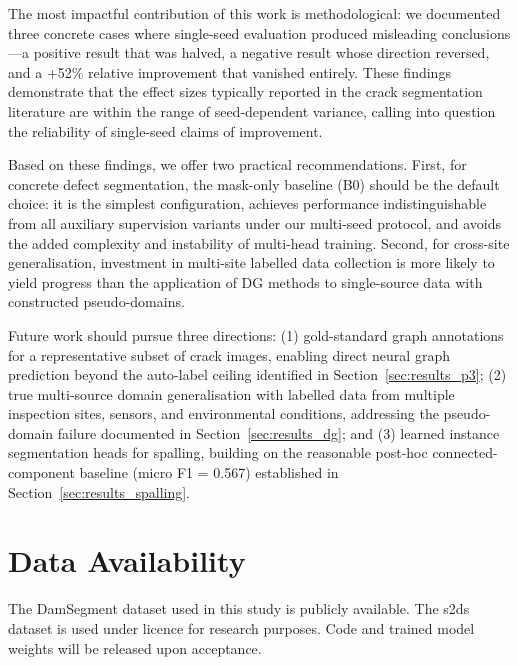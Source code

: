 \documentclass[preprint,12pt]{elsarticle}
\begin{document}
The most impactful contribution of this work is methodological: we documented three concrete cases where single-seed evaluation produced misleading conclusions---a positive result that was halved, a negative result whose direction reversed, and a +52\% relative improvement that vanished entirely. These findings demonstrate that the effect sizes typically reported in the crack segmentation literature are within the range of seed-dependent variance, calling into question the reliability of single-seed claims of improvement.

Based on these findings, we offer two practical recommendations. First, for concrete defect segmentation, the mask-only baseline (B0) should be the default choice: it is the simplest configuration, achieves performance indistinguishable from all auxiliary supervision variants under our multi-seed protocol, and avoids the added complexity and instability of multi-head training. Second, for cross-site generalisation, investment in multi-site labelled data collection is more likely to yield progress than the application of DG methods to single-source data with constructed pseudo-domains.

Future work should pursue three directions: (1) gold-standard graph annotations for a representative subset of crack images, enabling direct neural graph prediction beyond the auto-label ceiling identified in Section~\ref{sec:results_p3}; (2) true multi-source domain generalisation with labelled data from multiple inspection sites, sensors, and environmental conditions, addressing the pseudo-domain failure documented in Section~\ref{sec:results_dg}; and (3) learned instance segmentation heads for spalling, building on the reasonable post-hoc connected-component baseline (micro F1 = 0.567) established in Section~\ref{sec:results_spalling}.



\section*{Data Availability}

The DamSegment dataset used in this study is publicly available. The s2ds dataset is used under licence for research purposes. Code and trained model weights will be released upon acceptance.





\end{document}
